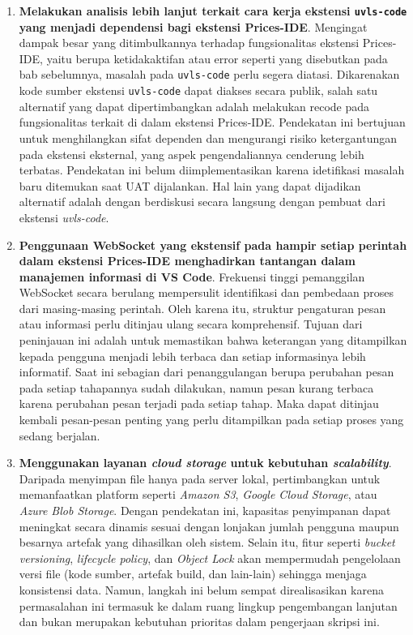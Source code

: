 \documentclass[12pt,a4paper,onecolumn]{article}
\begin{document}
\begin{enumerate}[leftmargin=*]
\item \textbf{Melakukan analisis lebih lanjut terkait cara kerja ekstensi \texttt{uvls-code} yang menjadi dependensi bagi ekstensi Prices-IDE}. Mengingat dampak besar yang ditimbulkannya terhadap fungsionalitas ekstensi Prices-IDE, yaitu berupa ketidakaktifan atau error seperti yang disebutkan pada bab sebelumnya, masalah pada \texttt{uvls-code} perlu segera diatasi. Dikarenakan kode sumber ekstensi \texttt{uvls-code} dapat diakses secara publik, salah satu alternatif yang dapat dipertimbangkan adalah melakukan recode pada fungsionalitas terkait di dalam ekstensi Prices-IDE. Pendekatan ini bertujuan untuk menghilangkan sifat dependen dan mengurangi risiko ketergantungan pada ekstensi eksternal, yang aspek pengendaliannya cenderung lebih terbatas. Pendekatan ini belum diimplementasikan karena idetifikasi masalah baru ditemukan saat UAT dijalankan. Hal lain yang dapat dijadikan alternatif adalah dengan berdiskusi secara langsung dengan pembuat dari ekstensi \textit{uvls-code}.

\item \textbf{Penggunaan WebSocket yang ekstensif pada hampir setiap perintah dalam ekstensi Prices-IDE menghadirkan tantangan dalam manajemen informasi di VS Code}. Frekuensi tinggi pemanggilan WebSocket secara berulang mempersulit identifikasi dan pembedaan proses dari masing-masing perintah. Oleh karena itu, struktur pengaturan pesan atau informasi perlu ditinjau ulang secara komprehensif. Tujuan dari peninjauan ini adalah untuk memastikan bahwa keterangan yang ditampilkan kepada pengguna menjadi lebih terbaca dan setiap informasinya lebih informatif. Saat ini sebagian dari penanggulangan berupa perubahan pesan pada setiap tahapannya sudah dilakukan, namun pesan kurang terbaca karena perubahan pesan terjadi pada setiap tahap. Maka dapat ditinjau kembali pesan-pesan penting yang perlu ditampilkan pada setiap proses yang sedang berjalan.

\item \textbf{Menggunakan layanan \textit{cloud storage} untuk kebutuhan \textit{scalability}}. Daripada menyimpan file hanya pada server lokal, pertimbangkan untuk memanfaatkan platform seperti \textit{Amazon S3}, \textit{Google Cloud Storage}, atau \textit{Azure Blob Storage}. Dengan pendekatan ini, kapasitas penyimpanan dapat meningkat secara dinamis sesuai dengan lonjakan jumlah pengguna maupun besarnya artefak yang dihasilkan oleh sistem. Selain itu, fitur seperti \textit{bucket versioning}, \textit{lifecycle policy}, dan \textit{Object Lock} akan mempermudah pengelolaan versi file (kode sumber, artefak build, dan lain-lain) sehingga menjaga konsistensi data. Namun, langkah ini belum sempat direalisasikan karena permasalahan ini termasuk ke dalam ruang lingkup pengembangan lanjutan dan bukan merupakan kebutuhan prioritas dalam pengerjaan skripsi ini.


\end{enumerate}
\end{document}
